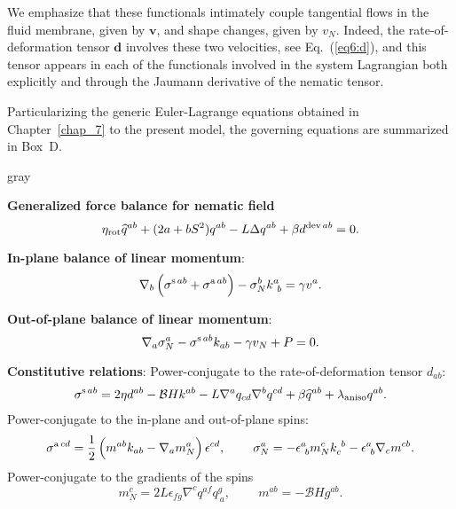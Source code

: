 We emphasize that these functionals intimately couple tangential flows in the fluid membrane, given by $\bm{v}$, and shape changes, given by $v_N$. Indeed, the rate-of-deformation tensor $\bm{d}$ involves these two velocities, see Eq.~(\ref{eq6:d}), and this tensor appears in each of the functionals involved in the system Lagrangian both explicitly and through the Jaumann derivative of the nematic tensor.

Particularizing the generic Euler-Lagrange equations obtained in Chapter~\ref{chap_7} to the present model, the governing equations are summarized in  Box~D. 


\begin{center}
\begin{mybox}{gray}{}
		
		\textbf{Generalized force balance for nematic field}
		\begin{equation}  \label{box_d_eq_1}
			\eta_{\text{rot}} \widehat{q}^{ab} +( 2a+bS^2 ) q^{ab} -  L\Delta q^{ab}   +\beta  d^{\textup{dev} \, ab}   = 0.
		\end{equation}
		
		\textbf{In-plane balance of linear momentum}:
		\begin{equation} \label{box_d_eq_2}
			\nabla_b \left(\sigma^{\textup{s} \, ab} + \sigma^{\textup{a} \, ab }   \right) -\sigma_N^b k^a_{~ b}= \gamma  v^a.
		\end{equation}
		
		\textbf{Out-of-plane  balance of linear momentum}:
		\begin{equation} \label{box_d_eq_3}
			\nabla_a \sigma^a_N - \sigma^{\textup{s}  \, ab} k_{ab} - \gamma v_N  + P = 0.
		\end{equation}
		
		\textbf{Constitutive relations}:
		\newline
		Power-conjugate to the rate-of-deformation tensor $d_{ab}$:
		\begin{align} \label{box_d_eq_4}
			\sigma^{\textup{s} \, ab}  =    2\eta d^{ab} -\mathcal{B}Hk^{ab}  -L\nabla^a q_{cd} \nabla^b q^{cd}    + \beta \widehat{q}^{ab}   +  \lambda_{\rm aniso} q^{ab}  . 
		\end{align}
		Power-conjugate to the in-plane and out-of-plane spins:
		\begin{align}  \label{box_d_eq_5}
			\sigma^{\textup{a} \, cd } = \frac{1}{2}\left(m^{ab} k_{ab} - \nabla_a m_N^a\right)\epsilon^{cd},
			\;\;\;\;\;\;\;\;
			\sigma_{N}^a  =- \epsilon^a_{~b} m_N^{c} k^{~b}_{c} - \epsilon^a_{~b}\nabla_c m^{cb}.
		\end{align}
		Power-conjugate to the gradients of the spins
		\begin{equation}  \label{box_d_eq_6}
			m_{N}^c= 2 L \epsilon_{fg} \nabla^c q^{af} q^g_{~a},
			\;\;\;\;\;\;\;\; m^{ab} = - \mathcal{B} Hg^{ab}.
		\end{equation}
		

\end{mybox}
\end{center}
